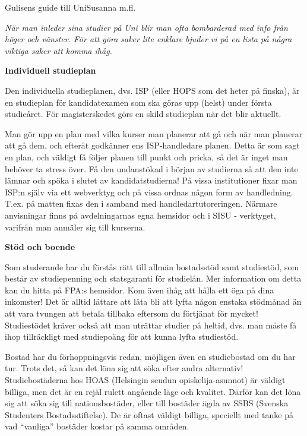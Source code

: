 \documentclass{spektraklet}
\begin{document}
\begin{artikel}{Gulisens guide till Uni}{Susanna m.fl.}

\textit{När man inleder sina studier på Uni blir man ofta bombarderad med info från höger och vänster. För att göra saker lite enklare bjuder vi på en lista på några viktiga saker att komma ihåg.}

\textbf{Individuell studieplan}

Den individuella studieplanen, dvs. ISP (eller HOPS som det heter på finska), är en studieplan för kandidatexamen som ska göras upp (helst) under första studieåret. För magisterskedet görs en skild studieplan när det blir aktuellt.

Man gör upp en plan med vilka kurser man planerar att gå och när man planerar att gå dem, och efteråt godkänner ens ISP-handledare planen. Detta är som sagt en plan, och väldigt få följer planen till punkt och pricka, så det är inget man behöver ta stress över. Få den undanstökad i början av studierna så att den inte lämnar och spöka i slutet av kandidatstudierna! På vissa institutioner fixar man ISP:n själv via ett webverktyg och på vissa ordnas någon form av handledning. T.ex. på matten fixas den i samband med handledartutoreringen. Närmare anvisningar finns på avdelningarnas egna hemsidor och i SISU - verktyget, varifrån man anmäler sig till kurserna.

\textbf{Stöd och boende}

Som studerande har du förstås rätt till allmän bostadsstöd samt studiestöd, som består av studiepenning och statsgaranti för studielån. Mer information om detta kan du hitta på FPA:s hemsidor. Kom även ihåg att hålla ett öga på dina inkomster! Det är alltid lättare att låta bli att lyfta någon enstaka stödmånad än att vara tvungen att betala tillbaka eftersom du förtjänat för mycket! Studiestödet kräver också att man uträttar studier på heltid, dvs. man måste få ihop tillräckligt med studiepoäng för att kunna lyfta studiestöd.

Bostad har du förhoppningsvis redan, möjligen även en studiebostad om du har tur. Trots det, så kan det löna sig att söka efter andra alternativ! Studiebostäderna hos HOAS (Helsingin seudun opiskelija-asunnot) är väldigt billiga, men det är en rejäl rulett angående läge och kvalitet. Därför kan det löna sig att söka sig till nationsbostäder, eller till bostäder ägda av SSBS (Svenska Studenters Bostadsstiftelse). De är oftast väldigt billiga, speciellt med tanke på vad “vanliga” bostäder kostar på samma områden.


\end{artikel}
\end{document}
